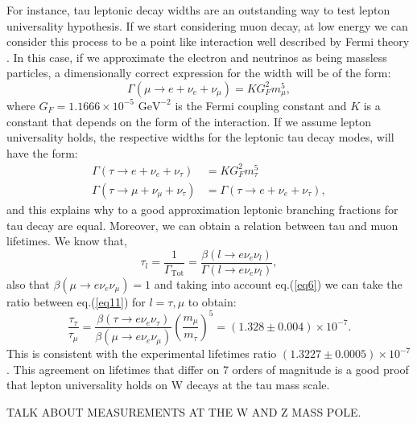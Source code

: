 For instance, tau leptonic decay widths are an outstanding way to test lepton universality hypothesis. If we start considering muon decay, at low energy we can consider this process to be a point like interaction well described by Fermi theory \cite{FermiTheory}. In this case, if we approximate the electron and neutrinos as being massless particles, a dimensionally correct expression for the width will be of the form:
\begin{equation}
	\Gamma(\mu\to e+\nu_e +\nu_\mu)=KG_{F}^{2}m_{\mu}^{5},
\end{equation} 
where $G_F=1.1666\times 10^{-5} \text{ GeV}^{-2}$ is the Fermi coupling constant and $K$ is a constant that depends on the form of the interaction. If we assume lepton universality holds, the respective widths for the leptonic tau decay modes, will have the form:
\begin{align}
\Gamma(\tau\to e+\nu_e +\nu_\tau)&=KG_{F}^{2}m_{\tau}^{5}
\\
\Gamma(\tau\to \mu+\nu_\mu +\nu_\tau)&=\Gamma(\tau\to e+\nu_e +\nu_\tau),
\end{align}  
and this explains why to a good approximation leptonic branching fractions for tau decay are equal. Moreover, we can obtain a relation between tau and muon lifetimes. We know that,
\begin{equation}
	\tau_l=\frac{1}{\Gamma_\text{Tot}}=\frac{\beta(l\to e\nu_e \nu_l)}{\Gamma(l\to e\nu_e \nu_l)},
	\label{eq11}
\end{equation}
also that $\beta(\mu\to e\nu_e \nu_\mu)=1$ and taking into account eq.(\ref{eq6}) we can take the ratio between eq.(\ref{eq11}) for $l=\tau ,\mu$ to obtain:
\begin{equation}
\frac{\tau_\tau}{\tau_\mu}=\frac{\beta(\tau\to e\nu_e \nu_\tau)}{\beta(\mu\to e\nu_e \nu_\mu)}\left(\frac{m_\mu}{m_\tau}\right)^5=(1.328\pm 0.004)\times 10^{-7}.
\end{equation}
This is consistent with the experimental lifetimes ratio $(1.3227\pm 0.0005)\times10^{-7}$. This agreement on lifetimes that differ on 7 orders of magnitude is a good proof that lepton universality holds on W decays at the tau mass scale.

TALK ABOUT MEASUREMENTS AT THE W AND Z MASS POLE.


